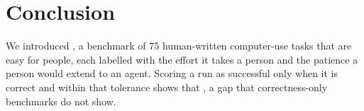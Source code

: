 \section{Conclusion}
\label{sec:conclusion}

We introduced \bench, a benchmark of 75 human-written computer-use tasks that are easy for people, each labelled with the effort it takes a person and the patience a person would extend to an agent. Scoring a run as successful only when it is correct and within that tolerance shows that , a gap that correctness-only benchmarks do not show. 
